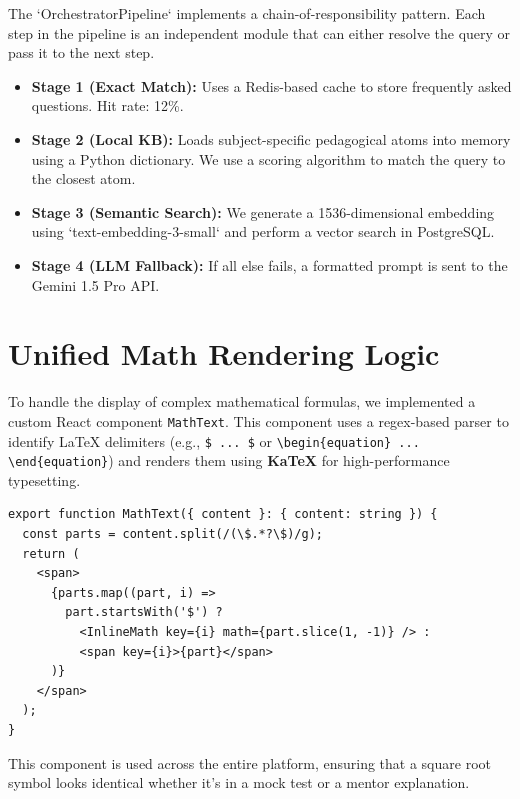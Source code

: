 The `OrchestratorPipeline` implements a chain-of-responsibility pattern. Each step in the pipeline is an independent module that can either resolve the query or pass it to the next step.

\begin{itemize}
    \item \textbf{Stage 1 (Exact Match):} Uses a Redis-based cache to store frequently asked questions. Hit rate: 12\%.
    \item \textbf{Stage 2 (Local KB):} Loads subject-specific pedagogical atoms into memory using a Python dictionary. We use a scoring algorithm to match the query to the closest atom.
    \item \textbf{Stage 3 (Semantic Search):} We generate a 1536-dimensional embedding using `text-embedding-3-small` and perform a vector search in PostgreSQL.
    \item \textbf{Stage 4 (LLM Fallback):} If all else fails, a formatted prompt is sent to the Gemini 1.5 Pro API.
\end{itemize}

\section{Unified Math Rendering Logic}

To handle the display of complex mathematical formulas, we implemented a custom React component \texttt{MathText}. This component uses a regex-based parser to identify LaTeX delimiters (e.g., \verb|$ ... $| or \verb|\begin{equation} ... \end{equation}|) and renders them using \textbf{KaTeX} for high-performance typesetting.
\newpage
\begin{verbatim}
export function MathText({ content }: { content: string }) {
  const parts = content.split(/(\$.*?\$)/g);
  return (
    <span>
      {parts.map((part, i) => 
        part.startsWith('$') ? 
          <InlineMath key={i} math={part.slice(1, -1)} /> : 
          <span key={i}>{part}</span>
      )}
    </span>
  );
}
\end{verbatim}
This component is used across the entire platform, ensuring that a square root symbol looks identical whether it's in a mock test or a mentor explanation.


